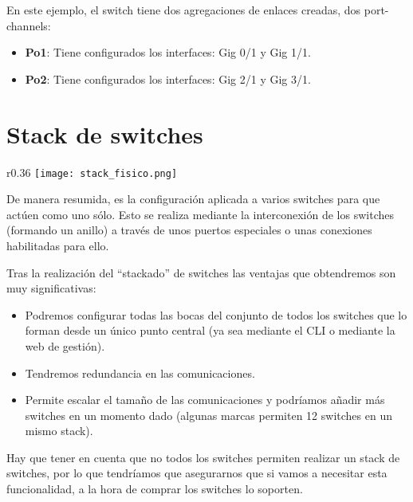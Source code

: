 En este ejemplo, el switch tiene dos agregaciones de enlaces creadas, dos port-channels:
\begin{itemize}
    \item \textbf{Po1}: Tiene configurados los interfaces: Gig 0/1 y Gig 1/1.
    \item \textbf{Po2}: Tiene configurados los interfaces: Gig 2/1 y Gig 3/1.
\end{itemize}



\hypertarget{stack_switches}{}
\section{Stack de switches}

\begin{wrapfigure}{r}{0.36\linewidth}
    \centering
    \vspace{-40pt}
    \texttt{[image: stack\_fisico.png]}
    \vspace{-32pt}
    \vspace{-30pt}
\end{wrapfigure}
De manera resumida, es la configuración aplicada a varios switches para que actúen como uno sólo. Esto se realiza mediante la interconexión de los switches (formando un anillo) a través de unos puertos especiales o unas conexiones habilitadas para ello.

Tras la realización del “stackado” de switches las ventajas que obtendremos son muy significativas:

\begin{itemize}
    \item Podremos configurar todas las bocas del conjunto de todos los switches que lo forman desde un único punto central (ya sea mediante el CLI o mediante la web de gestión).
    \item Tendremos redundancia en las comunicaciones.
    \item Permite escalar el tamaño de las comunicaciones y podríamos añadir más switches en un momento dado (algunas marcas permiten 12 switches en un mismo stack).
\end{itemize}

Hay que tener en cuenta que no todos los switches permiten realizar un stack de switches, por lo que tendríamos que asegurarnos que si vamos a necesitar esta funcionalidad, a la hora de comprar los switches lo soporten.

